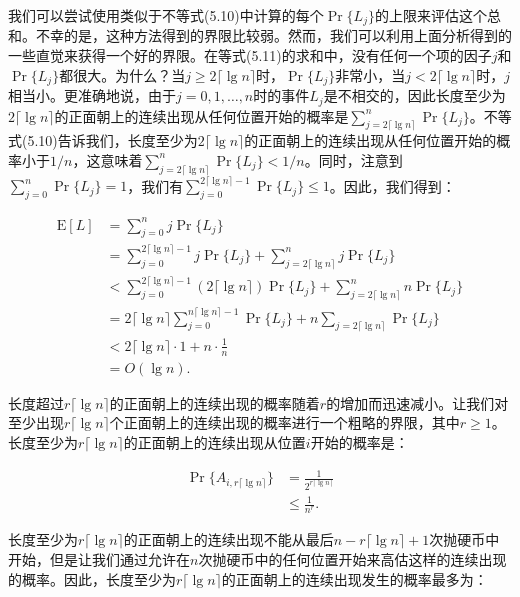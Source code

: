 \documentclass[lang=cn,newtx,10pt,scheme=chinese]{elegantbook}
\begin{document}
我们可以尝试使用类似于不等式(5.10)中计算的每个$\operatorname{Pr}\{L_j\}$的上限来评估这个总和。不幸的是，这种方法得到的界限比较弱。然而，我们可以利用上面分析得到的一些直觉来获得一个好的界限。在等式(5.11)的求和中，没有任何一个项的因子$j$和$\operatorname{Pr}\{L_j\}$都很大。为什么？当$j\geq 2\lceil\lg n\rceil$时，$\operatorname{Pr}\{L_j\}$非常小，当$j<2\lceil\lg n\rceil$时，$j$相当小。更准确地说，由于$j=0,1,\ldots,n$时的事件$L_j$是不相交的，因此长度至少为$2\lceil\lg n\rceil$的正面朝上的连续出现从任何位置开始的概率是$\sum_{j=2\lceil\lg n\rceil}^n \operatorname{Pr}\{L_j\}$。不等式(5.10)告诉我们，长度至少为$2\lceil\lg n\rceil$的正面朝上的连续出现从任何位置开始的概率小于$1/n$，这意味着$\sum_{j=2\lceil\lg n\rceil}^n \operatorname{Pr}\{L_j\}<1/n$。同时，注意到$\sum_{j=0}^n \operatorname{Pr}\{L_j\}=1$，我们有$\sum_{j=0}^{2\lceil\lg n\rceil-1} \operatorname{Pr}\{L_j\} \leq 1$。因此，我们得到：

$$
\begin{aligned}
\mathrm{E}[L] & =\sum_{j=0}^n j \operatorname{Pr}\{L_j\} \\
& =\sum_{j=0}^{2\lceil\lg n\rceil-1} j \operatorname{Pr}\{L_j\}+\sum_{j=2\lceil\lg n\rceil}^n j \operatorname{Pr}\{L_j\} \\
& <\sum_{j=0}^{2\lceil\lg n\rceil-1}(2\lceil\lg n\rceil) \operatorname{Pr}\{L_j\}+\sum_{j=2\lceil\lg n\rceil}^n n \operatorname{Pr}\{L_j\} \\
& =2\lceil\lg n\rceil \sum_{j=0}^{n\lceil\lg n\rceil-1} \operatorname{Pr}\{L_j\}+n \sum_{j=2\lceil\lg n\rceil} \operatorname{Pr}\{L_j\} \\
& <2\lceil\lg n\rceil \cdot 1+n \cdot \frac{1}{n} \\
& =O(\lg n) .
\end{aligned}
$$

长度超过$r\lceil\lg n\rceil$的正面朝上的连续出现的概率随着$r$的增加而迅速减小。让我们对至少出现$r\lceil\lg n\rceil$个正面朝上的连续出现的概率进行一个粗略的界限，其中$r\geq 1$。长度至少为$r\lceil\lg n\rceil$的正面朝上的连续出现从位置$i$开始的概率是：

$$
\begin{aligned}
\operatorname{Pr}\{A_{i, r\lceil\lg n\rceil}\} & =\frac{1}{2^{r\lceil\lg n\rceil}} \\
& \leq \frac{1}{n^r} .
\end{aligned}
$$

长度至少为$r\lceil\lg n\rceil$的正面朝上的连续出现不能从最后$n-r\lceil\lg n\rceil+1$次抛硬币中开始，但是让我们通过允许在$n$次抛硬币中的任何位置开始来高估这样的连续出现的概率。因此，长度至少为$r\lceil\lg n\rceil$的正面朝上的连续出现发生的概率最多为：
\end{document}
